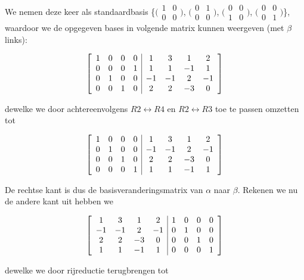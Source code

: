\documentclass[lineaire_algebra_oplossingen.tex]{subfiles}
\begin{document}
We nemen deze keer als standaardbasis \{$\bigl(
\begin{smallmatrix}
1&0\\ 0&0
\end{smallmatrix}
\bigr)$,
$\bigl(
\begin{smallmatrix}
0&1\\ 0&0
\end{smallmatrix}
\bigr)$,
$\bigl(
\begin{smallmatrix}
0&0\\ 1&0
\end{smallmatrix}
\bigr)$,
$\bigl(
\begin{smallmatrix}
0&0\\ 0&1
\end{smallmatrix}
\bigr)$\}, waardoor we de opgegeven bases in volgende matrix kunnen weergeven (met $\beta$ links):

\[
\left[
\begin{array}{ c c c c | c c c c }
1 & 0 & 0 & 0 & 1 & 3 & 1 & 2\\
0 & 0 & 0 & 1 & 1 & 1 & -1 & 1\\
0 & 1 & 0 & 0 & -1 & -1 & 2 & -1\\
0 & 0 & 1 & 0 & 2 & 2 & -3 & 0
\end{array}
\right]
\]

dewelke we door achtereenvolgens $R2 \leftrightarrow R4$ en $R2 \leftrightarrow R3$ toe te passen omzetten tot

\[
\left[
\begin{array}{ c c c c | c c c c }
1 & 0 & 0 & 0 & 1 & 3 & 1 & 2\\
0 & 1 & 0 & 0 & -1 & -1 & 2 & -1\\
0 & 0 & 1 & 0 & 2 & 2 & -3 & 0\\
0 & 0 & 0 & 1 & 1 & 1 & -1 & 1
\end{array}
\right]
\]

De rechtse kant is dus de basisveranderingsmatrix van $\alpha$ naar $\beta$. Rekenen we nu de andere kant uit hebben we

\[
\left[
\begin{array}{ c c c c | c c c c }
1 & 3 & 1 & 2 & 1 & 0 & 0 & 0\\
-1 & -1 & 2 & -1 & 0 & 1 & 0 & 0\\
2 & 2 & -3 & 0 & 0 & 0 & 1 & 0\\
1 & 1 & -1 & 1 & 0 & 0 & 0 & 1
\end{array}
\right]
\]

dewelke we door rijreductie terugbrengen tot
\end{document}
